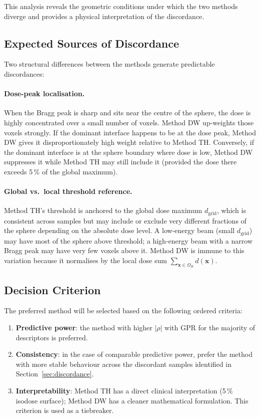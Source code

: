 \documentclass[11pt,a4paper]{article}
\newcommand{\vx}{\mathbf{x}}
\begin{document}
This analysis reveals the geometric conditions under which the two methods
diverge and provides a physical interpretation of the discordance.

\subsection{Expected Sources of Discordance}

Two structural differences between the methods generate predictable
discordances:

\paragraph{Dose-peak localisation.}
When the Bragg peak is sharp and sits near the centre of the sphere, the
dose is highly concentrated over a small number of voxels.
Method DW up-weights those voxels strongly.
If the dominant interface happens to be at the dose peak, Method DW gives it
disproportionately high weight relative to Method TH.
Conversely, if the dominant interface is at the sphere boundary where dose is
low, Method DW suppresses it while Method TH may still include it (provided
the dose there exceeds 5\,\% of the global maximum).

\paragraph{Global vs.\ local threshold reference.}
Method TH's threshold is anchored to the global dose maximum $d_{\mathrm{grid}}$,
which is consistent across samples but may include or exclude very different
fractions of the sphere depending on the absolute dose level.
A low-energy beam (small $d_{\mathrm{grid}}$) may have most of the sphere above
threshold; a high-energy beam with a narrow Bragg peak may have very few
voxels above it.
Method DW is immune to this variation because it normalises by the local dose
sum $\sum_{\vx \in \Omega_R} d(\vx)$.

\subsection{Decision Criterion}

The preferred method will be selected based on the following ordered criteria:
\begin{enumerate}
    \item \textbf{Predictive power}: the method with higher $|\rho|$ with GPR
          for the majority of descriptors is preferred.
    \item \textbf{Consistency}: in the case of comparable predictive power,
          prefer the method with more stable behaviour across the discordant
          samples identified in Section~\ref{sec:discordance}.
    \item \textbf{Interpretability}: Method TH has a direct clinical
          interpretation (5\,\% isodose surface); Method DW has a cleaner
          mathematical formulation.
          This criterion is used as a tiebreaker.
\end{enumerate}
\end{document}
